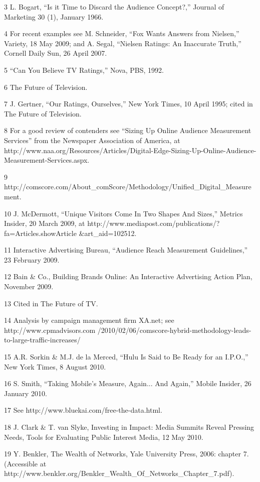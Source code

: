 3 L. Bogart, ``Is it Time to Discard the Audience Concept?,'' Journal of Marketing 30
(1), January 1966.

4 For recent examples see M. Schneider, ``Fox Wants Answers from Nielsen,'' Variety,
18 May 2009; and A. Segal, ``Nielsen Ratings: An Inaccurate Truth,'' Cornell Daily
Sun, 26 April 2007.

5 ``Can You Believe TV Ratings,'' Nova, PBS, 1992.

6 The Future of Television.

7 J. Gertner, ``Our Ratings, Ourselves,'' New York Times, 10 April 1995; cited in The
Future of Television.

8 For a good review of contenders see ``Sizing Up Online Audience Measurement
Services'' from the Newspaper Association of America, at
http://www.naa.org/Resources/Articles/Digital-Edge-Sizing-Up-Online-Audience-
Measurement-Services.aspx.

9 http://comscore.com/About_comScore/Methodology/Unified_Digital_Measurement.

10 J. McDermott, ``Unique Visitors Come In Two Shapes And Sizes,'' Metrics Insider,
20 March 2009, at http://www.mediapost.com/publications/?fa=Articles.showArticle
&art_aid=102512.

11 Interactive Advertising Bureau, ``Audience Reach Measurement Guidelines,'' 23
February 2009.

12 Bain & Co., Building Brands Online: An Interactive Advertising Action Plan,
November 2009.

13 Cited in The Future of TV.

14 Analysis by campaign management firm XA.net; see http://www.cpmadvisors.com
/2010/02/06/comscore-hybrid-methodology-leads-to-large-traffic-increases/

15 A.R. Sorkin & M.J. de la Merced, ``Hulu Is Said to Be Ready for an I.P.O.,'' New
York Times, 8 August 2010.

16 S. Smith, ``Taking Mobile's Measure, Again... And Again,'' Mobile Insider, 26
January 2010.

17 See http://www.bluekai.com/free-the-data.html.

18 J. Clark & T. van Slyke, Investing in Impact: Media Summits Reveal Pressing
Needs, Tools for Evaluating Public Interest Media, 12 May 2010.

19 Y. Benkler, The Wealth of Networks, Yale University Press, 2006:
chapter 7. (Accessible at
http://www.benkler.org/Benkler_Wealth_Of_Networks_Chapter_7.pdf).



